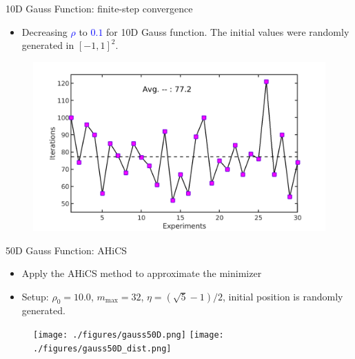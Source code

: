 \documentclass{beamer}
\begin{document}
\begin{frame}{10D Gauss Function: finite-step convergence}
\footnotesize{
	\begin{itemize}
		\item{Decreasing \textcolor{blue}{$\rho$} to
			\textcolor{blue}{$0.1$} for 10D Gauss function. The
			initial values were randomly generated in
			$[-1,1]^2$.}
	\end{itemize}
	}
	\vspace{-0.6cm}
\begin{figure}[!htbp]
	\centering
	  \includegraphics[scale=0.22]{./figures/gauss10Drandr0_1.png}
\end{figure}
\end{frame}

\begin{frame}{50D Gauss Function: AHiCS}
\footnotesize{
	\begin{itemize}
		\item Apply the AHiCS method to approximate the minimizer
		\item Setup: $\rho_0 = 10.0$, $m_{\max}=32$, $\eta =
			(\sqrt{5}-1)/2$, initial position is randomly generated.
	\end{itemize}
	}
\begin{figure}[!htbp]
	\centering
	  \texttt{[image: ./figures/gauss50D.png]}
	  \texttt{[image: ./figures/gauss50D\_dist.png]}
\end{figure}

\end{frame}
\end{document}

